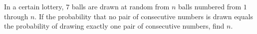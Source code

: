 In a certain lottery, $7$ balls are drawn at random from $n$ balls numbered from $1$ through $n$. If the probability that no pair of consecutive numbers is drawn equals the probability of drawing exactly one pair of consecutive numbers, find $n$.
